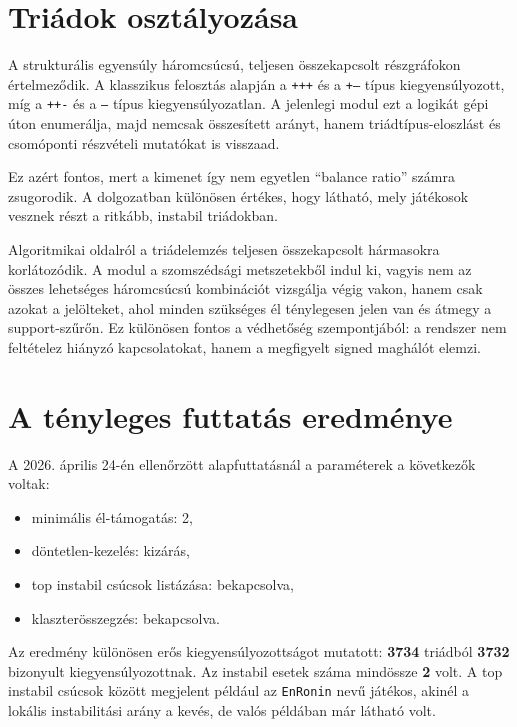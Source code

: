 \documentclass[a4paper,12pt]{report}
\begin{document}
\section{Triádok osztályozása}

A strukturális egyensúly háromcsúcsú, teljesen összekapcsolt részgráfokon értelmeződik. A klasszikus felosztás alapján a \texttt{+++} és a \texttt{+--} típus kiegyensúlyozott, míg a \texttt{++-} és a \texttt{---} típus kiegyensúlyozatlan. A jelenlegi modul ezt a logikát gépi úton enumerálja, majd nemcsak összesített arányt, hanem triádtípus-eloszlást és csomóponti részvételi mutatókat is visszaad.

Ez azért fontos, mert a kimenet így nem egyetlen ``balance ratio'' számra zsugorodik. A dolgozatban különösen értékes, hogy látható, mely játékosok vesznek részt a ritkább, instabil triádokban.

Algoritmikai oldalról a triádelemzés teljesen összekapcsolt hármasokra korlátozódik. A modul a szomszédsági metszetekből indul ki, vagyis nem az összes lehetséges háromcsúcsú kombinációt vizsgálja végig vakon, hanem csak azokat a jelölteket, ahol minden szükséges él ténylegesen jelen van és átmegy a support-szűrőn. Ez különösen fontos a védhetőség szempontjából: a rendszer nem feltételez hiányzó kapcsolatokat, hanem a megfigyelt signed maghálót elemzi.

\section{A tényleges futtatás eredménye}

A 2026. április 24-én ellenőrzött alapfuttatásnál a paraméterek a következők voltak:

\begin{itemize}
    \item minimális él-támogatás: 2,
    \item döntetlen-kezelés: kizárás,
    \item top instabil csúcsok listázása: bekapcsolva,
    \item klaszterösszegzés: bekapcsolva.
\end{itemize}

Az eredmény különösen erős kiegyensúlyozottságot mutatott: \textbf{3734} triádból \textbf{3732} bizonyult kiegyensúlyozottnak. Az instabil esetek száma mindössze \textbf{2} volt. A top instabil csúcsok között megjelent például az \texttt{EnRonin} nevű játékos, akinél a lokális instabilitási arány a kevés, de valós példában már látható volt.
\end{document}
